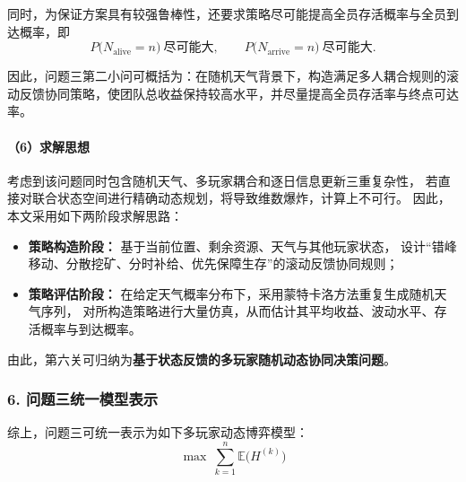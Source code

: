 \documentclass[UTF8,a4paper,12pt]{ctexart}
\begin{document}
同时，为保证方案具有较强鲁棒性，还要求策略尽可能提高全员存活概率与全员到达概率，即
\[
P\bigl(N_{\mathrm{alive}}=n\bigr)\ \text{尽可能大}, \qquad
P\bigl(N_{\mathrm{arrive}}=n\bigr)\ \text{尽可能大}.
\]

因此，问题三第二小问可概括为：在随机天气背景下，构造满足多人耦合规则的滚动反馈协同策略，使团队总收益保持较高水平，并尽量提高全员存活率与终点可达率。

\paragraph{（6）求解思想}

考虑到该问题同时包含随机天气、多玩家耦合和逐日信息更新三重复杂性，
若直接对联合状态空间进行精确动态规划，将导致维数爆炸，计算上不可行。
因此，本文采用如下两阶段求解思路：

\begin{itemize}
    \item \textbf{策略构造阶段：} 基于当前位置、剩余资源、天气与其他玩家状态，
    设计“错峰移动、分散挖矿、分时补给、优先保障生存”的滚动反馈协同规则；
    \item \textbf{策略评估阶段：} 在给定天气概率分布下，采用蒙特卡洛方法重复生成随机天气序列，
    对所构造策略进行大量仿真，从而估计其平均收益、波动水平、存活概率与到达概率。
\end{itemize}

由此，第六关可归纳为\textbf{基于状态反馈的多玩家随机动态协同决策问题}。

\subsubsection*{6. 问题三统一模型表示}

综上，问题三可统一表示为如下多玩家动态博弈模型：
\[
\max \ \sum_{k=1}^{n}\mathbb{E}\bigl(H^{(k)}\bigr)
\]
\end{document}
